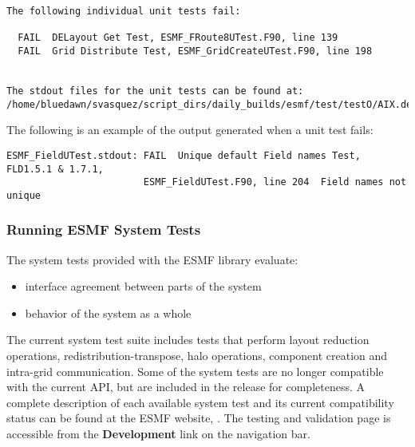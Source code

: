 \begin{verbatim}
The following individual unit tests fail:

  FAIL  DELayout Get Test, ESMF_FRoute8UTest.F90, line 139                                                                                                                                                                                                       
  FAIL  Grid Distribute Test, ESMF_GridCreateUTest.F90, line 198                                                                                                                                                                                                 


The stdout files for the unit tests can be found at:
/home/bluedawn/svasquez/script_dirs/daily_builds/esmf/test/testO/AIX.default.64.default

\end{verbatim}

The following is an example of the output generated when a unit test fails:
\begin{verbatim}
ESMF_FieldUTest.stdout: FAIL  Unique default Field names Test, FLD1.5.1 & 1.7.1,
                        ESMF_FieldUTest.F90, line 204  Field names not unique
\end{verbatim}

\subsubsection{Running ESMF System Tests}
\label{SystemTestDescription}

The system tests provided with the ESMF library evaluate:
\begin{itemize}
\item interface agreement between parts of the system
\item behavior of the system as a whole
\end{itemize}

The current system test suite includes tests that perform layout
reduction operations, redistribution-transpose, halo operations,
component creation and intra-grid communication.  Some of the system
tests are no longer compatible with the current API, but are included
in the release for completeness.  A complete description of each
available system test and its current compatibility status can be
found at the ESMF website,
.  
The testing
and validation page is accessible from the {\bf Development} 
link on the navigation bar.


